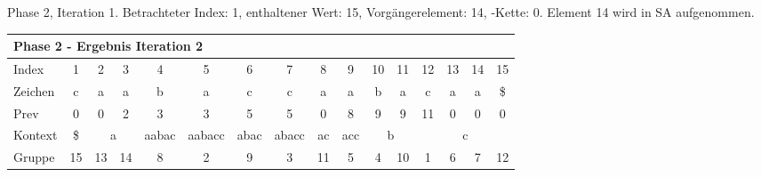\begin{table}[H]
\caption[Phase 2, Iteration 1]{Phase 2, Iteration 1. Betrachteter Index: 1, enthaltener Wert: 15, Vorgängerelement: 14, \prevpointer-Kette: 0. Element 14 wird in SA aufgenommen.}
\label{table_complex_example_2_1} 
\end{table}

\begin{table}[H]
\centering
\begin{adjustbox}{max width=\textwidth}
\centering
\begin{tabular}{lccccccccccccccc}
\multicolumn{16}{l}{Phase 2 - Ergebnis Iteration 2}                                                                                                                                                                                                                                                                                                                   \\ \hline
\multicolumn{1}{l|}{Index}   & 1                       & 2                          & 3                                               & 4                          & 5                           & 6                         & 7                          & 8                       & 9                        & 10 & 11                      & 12  & 13  & 14  & 15  \\
\multicolumn{1}{l|}{Zeichen} & c                       & a                          & a                                               & b                          & a                           & c                         & c                          & a                       & a                        & b  & a                       & c   & a   & a   & \$  \\
\multicolumn{1}{l|}{Prev}    & 0                       & 0                          & 2                                               & 3                          & 3                           & 5                         & 5                          & 0                       & 8                        & 9  & 9                       & 11  & 0   & 0   & 0   \\ \hline
\multicolumn{1}{l|}{Kontext} & \multicolumn{1}{c|}{\$} & \multicolumn{2}{c|}{a}                                                       & \multicolumn{1}{c|}{aabac} & \multicolumn{1}{c|}{aabacc} & \multicolumn{1}{c|}{abac} & \multicolumn{1}{c|}{abacc} & \multicolumn{1}{c|}{ac} & \multicolumn{1}{c|}{acc} & \multicolumn{2}{c|}{b}       & \multicolumn{4}{c}{c} \\
\multicolumn{1}{l|}{Gruppe}  & \multicolumn{1}{c|}{15} & 13                         & \multicolumn{1}{c|}{14}                         & \multicolumn{1}{c|}{8}     & \multicolumn{1}{c|}{2}      & \multicolumn{1}{c|}{9}    & \multicolumn{1}{c|}{3}     & \multicolumn{1}{c|}{11} & \multicolumn{1}{c|}{5}   & 4  & \multicolumn{1}{c|}{10} & 1   & 6   & 7   & 12  \\

\end{tabular}
\end{adjustbox}
\end{table}
